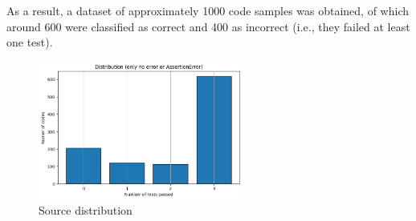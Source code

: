 As a result, a dataset of approximately 1000 code 
samples was obtained, of which around 600 were 
classified as correct and 400 as incorrect (i.e., 
they failed at least one test).



\begin{figure}[H]
    \centering
    \includegraphics[width=0.6\textwidth]{img/panetaltest/600600.png}
    \caption{Source distribution}
    \label{fig:panetaltest_600600}
\end{figure}